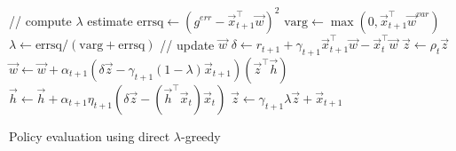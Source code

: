\documentclass[../main.tex]{subfiles}
\begin{document}
\begin{algorithm}[tb]
\begin{algorithmic}
            \STATE // compute $\lambda$ estimate
            \STATE $\text{errsq} \leftarrow (g^{err} - \vec{x}_{t + 1}^{\top} \vec{w})^2$
            \STATE $\text{varg} \leftarrow \max(0, \vec{x}_{t + 1}^{\top} \vec{w}^{var})$
            \STATE $\lambda \leftarrow \text{errsq} / (\text{varg} + \text{errsq})$
            \STATE // update $\vec{w}$
            \STATE $\delta \leftarrow r_{t + 1} + \gamma_{t + 1} \vec{x}_{t + 1}^{\top} \vec{w} - \vec{x}_t^{\top} \vec{w}$
            \STATE $\vec{z} \leftarrow \rho_t \vec{z}$
            \STATE $\vec{w} \leftarrow \vec{w} + \alpha_{t + 1} (\delta \vec{z} - \gamma_{t + 1} (1 - \lambda) \vec{x}_{t + 1}) (\vec{z}^{\top} \vec{h})$
            \STATE $\vec{h} \leftarrow \vec{h} + \alpha_{t + 1} \eta_{t + 1} (\delta \vec{z} - (\vec{h}^{\top} \vec{x}_t) \vec{x}_t)$
            \STATE $\vec{z} \leftarrow \gamma_{t + 1} \lambda \vec{z} + \vec{x}_{t + 1}$
    \end{algorithmic}
    \caption{Policy evaluation using direct $\lambda$-greedy}
    \label{alg:direct}
\end{algorithm}
\end{document}
